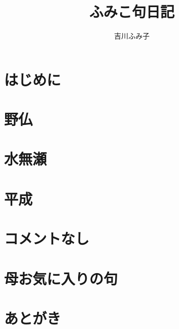 \documentclass[b5paper]{tbook}[tombow]
\begin{document}
\author{吉川ふみ子}
\title{ふみこ句日記}
\maketitle
\tableofcontents
\chapter*{はじめに}

\chapter{野仏}

\chapter{水無瀬}

\chapter{平成}

\vspace{0.6cm}
\chapter{コメントなし}

\chapter{母お気に入りの句}



%


\chapter*{あとがき}



%
\end{document}
